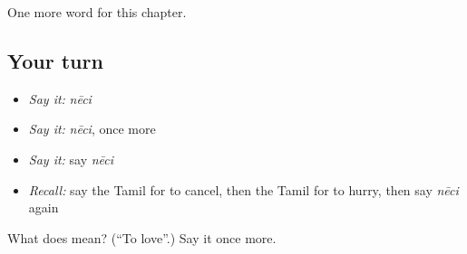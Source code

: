 \begin{grammarlens}[title={What you've built}]
One more word for this chapter.
\end{grammarlens}

\subsection*{Your turn}
\begin{itemize}
\raggedright
  \item \emph{Say it:} \emph{nēci}
  \item \emph{Say it:} \emph{nēci}, once more
  \item \emph{Say it:} say \emph{nēci}
  \item \emph{Recall:} say the Tamil for to cancel, then the Tamil for to hurry, then say \emph{nēci} again
\end{itemize}

\begin{tcolorbox}[breakable,colback=teal!4,colframe=teal!35!black,title={Before you move on}]
What does  mean? (\textquotedblleft{}To love\textquotedblright{}.) Say it once more.
\end{tcolorbox}
